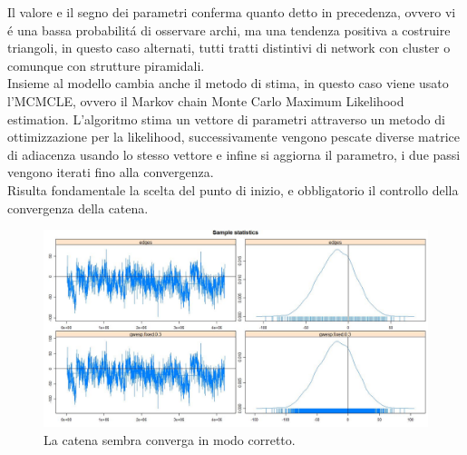 \documentclass[11pt,a4paper]{report}
\begin{document}
Il valore e il segno dei parametri conferma quanto detto in precedenza, ovvero vi \'e una bassa probabilit\'a di osservare archi, ma una tendenza positiva a costruire triangoli, in questo caso alternati, tutti tratti distintivi di network con cluster o comunque con strutture piramidali.
\\
Insieme al modello cambia anche il metodo di stima, in questo caso viene usato l'MCMCLE, ovvero il Markov chain Monte Carlo Maximum Likelihood estimation. L'algoritmo stima un vettore di parametri attraverso un metodo di ottimizzazione per la likelihood, successivamente vengono pescate diverse matrice di adiacenza usando lo stesso vettore e infine si aggiorna il parametro, i due passi vengono iterati fino alla convergenza.
\\
Risulta fondamentale la scelta del punto di inizio, e obbligatorio il controllo della convergenza della catena.
\begin{figure}[H]
	\centering
	\includegraphics[scale=0.5]{mcmc1}
	\caption{La catena sembra converga in modo corretto.}
\end{figure}
\end{document}
